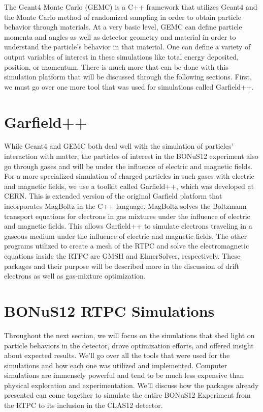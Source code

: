 The Geant4 Monte Carlo (GEMC) is a C++ framework that utilizes Geant4 and the Monte Carlo method of randomized sampling in order to obtain particle behavior through materials. At a very basic level, GEMC can define particle momenta and angles as well as detector geometry and material in order to understand the particle's behavior in that material. One can define a variety of output variables of interest in these simulations like total energy deposited, position, or momentum. There is much more that can be done with this simulation platform that will be discussed through the following sections. First, we must go over one more tool that was used for simulations called Garfield++.


\section{Garfield++}
While Geant4 and GEMC both deal well with the simulation of particles' interaction with matter, the particles of interest in the BONuS12 experiment also go through gases and will be under the influence of electric and magnetic fields. For a more specialized simulation of charged particles in such gases with electric and magnetic fields, we use a toolkit called Garfield++, which was developed at CERN. This is extended version of the original Garfield platform that incorporates MagBoltz in the C++ language. MagBoltz solves the Boltzmann transport equations for electrons in gas mixtures under the influence of electric and magnetic fields. This allows Garfield++ to simulate electrons traveling in a gaseous medium under the influence of electric and magnetic fields. The other programs utilized to create a mesh of the RTPC and solve the electromagnetic equations inside the RTPC are GMSH and ElmerSolver, respectively. These packages and their purpose will be described more in the discussion of drift electrons as well as gas-mixture optimization.

\section{BONuS12 RTPC Simulations}
Throughout the next section, we will focus on the simulations that shed light on particle behaviors in the detector, drove optimization efforts, and offered insight about expected results. We'll go over all the tools that were used for the simulations and how each one was utilized and implemented. Computer simulations are immensely powerful and tend to be much less expensive than physical exploration and experimentation. We'll discuss how the packages already presented can come together to simulate the entire BONuS12 Experiment from the RTPC to its inclusion in the CLAS12 detector.

